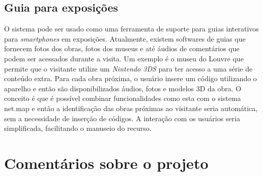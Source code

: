 \subsection{Guia para exposições}
O sistema pode ser usado como uma ferramenta de suporte para guias interativos para \textit{smartphones} em exposições. Atualmente, existem softwares de guias que fornecem fotos dos obras, fotos dos museus e até áudios de comentários que podem ser acessados durante a visita. Um exemplo é o museu do Louvre que permite que o visitante utilize um \textit{Nintendo 3DS} para ter acesso a uma série de conteúdo extra. Para cada obra próxima, o usuário insere um código utilizando o aparelho e então são disponibilizados áudios, fotos e modelos 3D da obra. O conceito é que é possível combinar funcionalidades como esta com o sistema net.map e então a identificação das obras próximas ao visitante seria automática, sem a necessidade de inserção de códigos. A interação com os usuários seria simplificada, facilitando o manuseio do recurso. 

\section{Comentários sobre o projeto}





